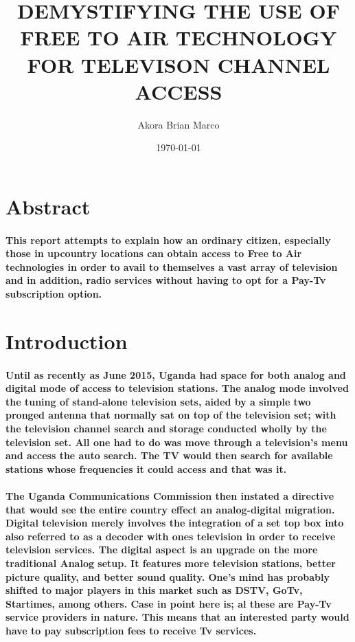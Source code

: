 \documentclass[a4paper,10pt]{report}
\begin{document}
\title{DEMYSTIFYING THE USE OF FREE TO AIR TECHNOLOGY FOR TELEVISON CHANNEL ACCESS}
\author{Akora Brian Marco}
\date{\today}
\maketitle
\section{Abstract}
\paragraph{\textrm{This report attempts to explain how an ordinary citizen, especially those in upcountry locations can obtain access to Free to Air technologies in order to avail to themselves  a vast array of television and in addition, radio services without having to opt for a Pay-Tv subscription option.}}
\section{Introduction}
\paragraph{Until as recently as June 2015, Uganda had space for both analog and digital mode of access to television stations. The analog mode involved the tuning of stand-alone television sets, aided by a simple two pronged antenna that normally sat on top of the television set; with the television channel search and storage conducted wholly by the television set. All one had to do was move through a television’s menu and access the auto search. The TV would then search for available stations whose frequencies it could access and that was it.}
\paragraph{The Uganda Communications Commission then instated a directive that would see the entire country effect an analog-digital migration. Digital television merely involves the integration of a set top box into also referred to as a decoder with ones television in order to receive television services. The digital aspect is an upgrade on the more traditional Analog setup. It features more television stations, better picture quality, and better sound quality. One’s mind has probably shifted to major players in this market such as DSTV, GoTv, Startimes, among others. Case in point here is; al these are Pay-Tv service providers in nature. This means that an interested party would have to pay subscription fees to receive Tv services. }
\end{document}

